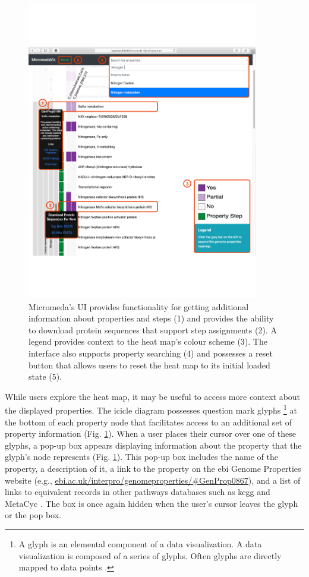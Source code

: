 \begin{figure}[!ht]
  \centering
	\includegraphics[width=0.9\textwidth]{media/micromeda-interface.pdf}
	 \caption{Micromeda's UI provides functionality for getting additional information about properties and steps (1) and provides the ability to download protein sequences that support step assignments (2). A legend provides context to the heat map's colour scheme (3). The interface also supports property searching (4) and possesses a reset button that allows users to reset the heat map to its initial loaded state (5).}
	 \label{fig:micromeda-interface}
\end{figure}

While users explore the heat map, it may be useful to access more context about the displayed properties. The icicle diagram possesses question mark glyphs \footnote{A glyph is an elemental component of a data visualization. A data visualization is composed of a series of glyphs. Often glyphs are directly mapped to data points \cite{chen}.} at the bottom of each property node that facilitates access to an additional set of property information (Fig. \ref{fig:micromeda-interface}). When a user places their cursor over one of these glyphs, a pop-up box appears displaying information about the property that the glyph's node represents (Fig. \ref{fig:micromeda-interface}). This pop-up box includes the name of the property, a description of it, a link to the property on the \gls{ebi}  Genome Properties website (e.g., \href{ebi.ac.uk/interpro/genomeproperties/\#GenProp0867}{ebi.ac.uk/interpro/genomeproperties/\#GenProp0867}), and a list of links to equivalent records in other pathways databases such as \gls{kegg} \cite{kanehisa2000kegg} and MetaCyc \cite{karp2002metacyc}. The box is once again hidden when the user's cursor leaves the glyph or the pop box.

